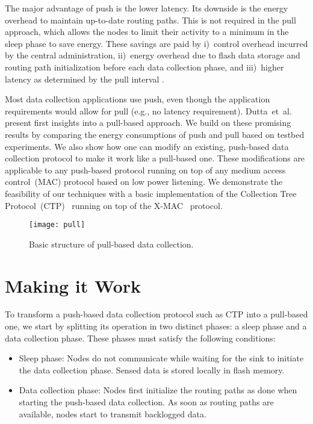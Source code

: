 \documentclass[10pt]{sensys-abstract}
\newcommand{\etal}{et~al.\xspace}
\newcommand{\eg}{e.g.,\xspace}
\begin{document}
The major advantage of push is the lower latency. Its downside is the energy overhead to maintain up-to-date routing paths. This is not required in the pull approach, which allows the nodes to limit their activity to a minimum in the sleep phase to save energy. These savings are paid by i)~control overhead incurred by the central administration, ii)~energy overhead due to flash data storage and routing path initialization before each data collection phase, and iii)~higher latency as determined by the pull interval .

Most data collection applications use push, even though the application requirements would allow for pull (\eg no latency requirement). Dutta~\etal~\cite{Dutta2007} present first insights into a pull-based approach. We build on these promising results by comparing the energy consumptions of push and pull based on testbed experiments. We also show how one can modify an existing, push-based data collection protocol to make it work like a pull-based one. These modifications are applicable to any push-based protocol running on top of any medium access control~(MAC) protocol based on low power listening. We demonstrate the feasibility of our techniques with a basic implementation of the Collection Tree Protocol~(CTP)~\cite{Gnawali2009b} running on top of the X-MAC~\cite{Buettner2006} protocol.

\begin{figure}
 \centering
 \texttt{[image: pull]}
 \caption{Basic structure of pull-based data collection.}
 \label{fig:pull}
\end{figure}

\section{Making it Work}\label{sec:approach}

To transform a push-based data collection protocol such as CTP into a pull-based one, we start by splitting its operation in two distinct phases: a sleep phase and a data collection phase. These phases must satisfy the following conditions:
\begin{itemize}
 \item Sleep phase: Nodes do not communicate while waiting for the sink to initiate the data collection phase. Sensed data is stored locally in flash memory.
 \item Data collection phase: Nodes first initialize the routing paths as done when starting the push-based data collection. As soon as routing paths are available, nodes start to transmit backlogged data.
\end{itemize}
\end{document}
